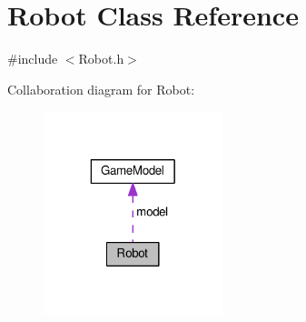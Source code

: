 \hypertarget{classRobot}{\section{Robot Class Reference}
\label{classRobot}
}


{\ttfamily \#include $<$Robot.\-h$>$}



Collaboration diagram for Robot\-:\nopagebreak
\begin{figure}[H]
\begin{center}
\leavevmode
\includegraphics[width=148pt]{classRobot__coll__graph}
\end{center}
\end{figure}
